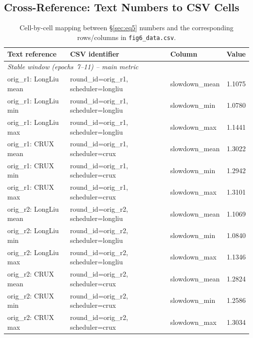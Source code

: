 \subsection*{Cross-Reference: Text Numbers to CSV Cells}
\label{sec:eq5-crossref}

\begin{table}[htbp]
\centering
\caption{Cell-by-cell mapping between \S\ref{sec:eq5} numbers and the corresponding rows/columns in \texttt{fig6\_data.csv}.}
\label{tab:eq5-crossref}
\footnotesize
\begin{tabular}{lllr}
\toprule
\textbf{Text reference} & \textbf{CSV identifier} & \textbf{Column} & \textbf{Value}\\
\midrule
\multicolumn{4}{l}{\textit{Stable window (epochs~7--11) -- main metric}} \\
orig\_r1: LongLiu mean & round\_id=orig\_r1, scheduler=longliu & slowdown\_mean & 1.1075\\
orig\_r1: LongLiu min & round\_id=orig\_r1, scheduler=longliu & slowdown\_min & 1.0780\\
orig\_r1: LongLiu max & round\_id=orig\_r1, scheduler=longliu & slowdown\_max & 1.1441\\
orig\_r1: CRUX mean & round\_id=orig\_r1, scheduler=crux & slowdown\_mean & 1.3022\\
orig\_r1: CRUX min & round\_id=orig\_r1, scheduler=crux & slowdown\_min & 1.2942\\
orig\_r1: CRUX max & round\_id=orig\_r1, scheduler=crux & slowdown\_max & 1.3101\\
orig\_r2: LongLiu mean & round\_id=orig\_r2, scheduler=longliu & slowdown\_mean & 1.1069\\
orig\_r2: LongLiu min & round\_id=orig\_r2, scheduler=longliu & slowdown\_min & 1.0840\\
orig\_r2: LongLiu max & round\_id=orig\_r2, scheduler=longliu & slowdown\_max & 1.1346\\
orig\_r2: CRUX mean & round\_id=orig\_r2, scheduler=crux & slowdown\_mean & 1.2824\\
orig\_r2: CRUX min & round\_id=orig\_r2, scheduler=crux & slowdown\_min & 1.2586\\
orig\_r2: CRUX max & round\_id=orig\_r2, scheduler=crux & slowdown\_max & 1.3034\\

\end{tabular}
\end{table}
